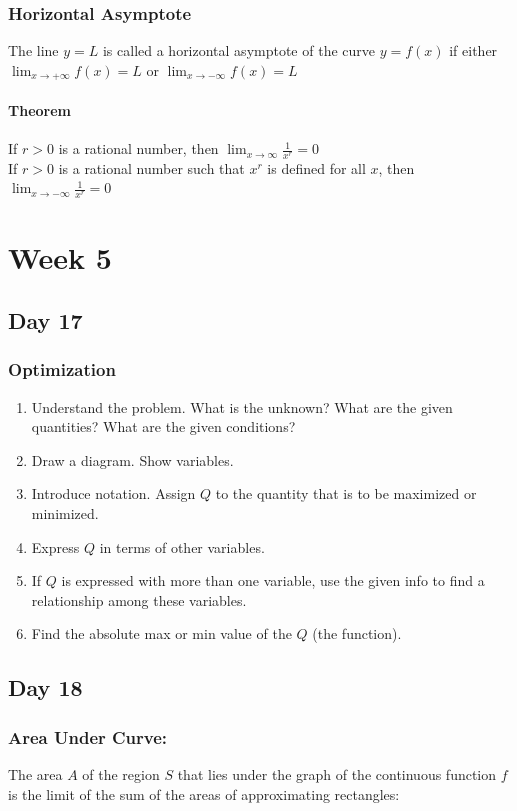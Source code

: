 \documentclass[12pt]{article}
\begin{document}
\subsubsection{Horizontal Asymptote} The line $y=L$ is called a  horizontal asymptote of the curve $y=f(x)$ if either $\lim_{x \to +\infty{}} f(x) = L$ or $\lim_{x \to -\infty{}} f(x) = L$

\paragraph{Theorem} If $r>0$ is a rational number, then $\lim_{x \to \infty{}} \frac{1}{x^r} = 0$\\
If $r>0$ is a rational number such that $x^r$ is defined for all $x$, then $\lim_{x \to -\infty{}} \frac{1}{x^r} = 0$


\section{Week 5}

\subsection{Day 17} 
\subsubsection{Optimization} 
\begin{enumerate}
    \item Understand the problem. What is the unknown? What are the given quantities? What are the given conditions?
    \item Draw a diagram.  Show variables.
    \item Introduce notation. Assign $Q$ to the quantity that is to be maximized or minimized.
    \item Express $Q$ in terms of other variables.
    \item If $Q$ is expressed with more than one variable, use the given info to find a relationship among these variables.
    \item Find the absolute max or min value of the $Q$ (the function). 
\end{enumerate}


\subsection{Day 18}
\subsubsection{Area Under Curve: } The area $A$ of the region $S$ that lies under the graph of the continuous function $f$ is the limit of the sum of the areas of approximating rectangles:
\end{document}
